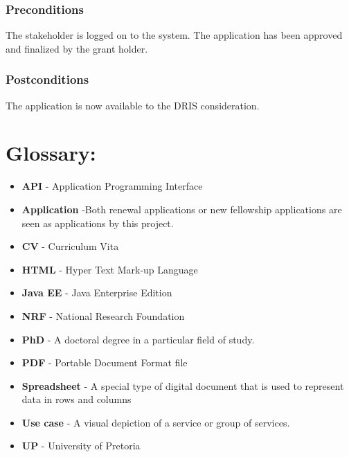 \documentclass[12pt]{article}
\begin{document}
\subsubsection*{Preconditions}
The stakeholder is logged on to the system. The application has been approved and finalized by the grant holder.

\subsubsection*{Postconditions}
The application is now available to the DRIS consideration.


\newpage
\section{Glossary:}
\vspace{0.2in}

\begin{itemize}

\item \textbf{API} - Application Programming Interface
\item \textbf{Application} -Both renewal applications or new fellowship applications are seen as applications by this project.
\item \textbf{CV} - Curriculum Vita
\item \textbf{HTML} - Hyper Text Mark-up Language
\item \textbf{Java EE} - Java Enterprise Edition
\item \textbf{NRF} - National Research Foundation
\item \textbf{PhD} - A doctoral degree in a particular field of study.
\item \textbf{PDF} - Portable Document Format file
\item \textbf{Spreadsheet} - A special type of digital document that is used to represent data in rows and columns
\item \textbf{Use case} - A visual depiction of a service or group of services.
\item \textbf{UP} - University of Pretoria
 


\end{itemize}	
\end{document}
